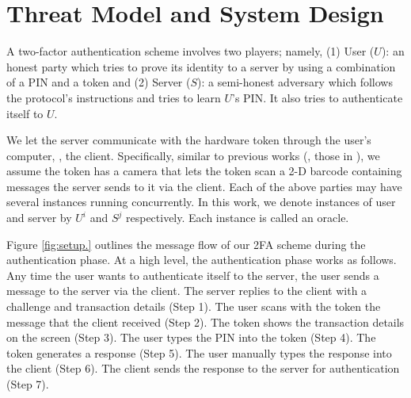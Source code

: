 


\section{Threat Model and System Design}\label{sec::model}

A two-factor authentication scheme involves two players; namely, (1) {User ($U$)}: an honest party which tries to prove its identity to a server by using a combination of a PIN and a token and (2) {Server ($S$)}:  a semi-honest adversary which follows the protocol's instructions and tries to learn $U$'s PIN. It also tries to authenticate itself to $U$.  


We let the server communicate with the hardware token through the user's computer, \ie, the client. Specifically, similar to previous works (\eg, those in \cite{JareckiJKSS21,Digipass-website,Gemalto}), we assume the token has a camera that lets the token scan a 2-D barcode containing messages the server sends to it via the client. Each of the above parties may have several instances running concurrently. In this work, we denote instances of user and server by  $U^{i}$ and  $S^{j}$ respectively. Each instance is called an oracle.  

Figure \ref{fig:setup.} outlines the message flow of our 2FA scheme during the authentication phase.  At a high level, the authentication phase works as follows. Any time the user wants to authenticate itself to the server, the user sends a message to the server via the client.  The server replies to the client with a challenge and transaction details (Step 1). The user scans with the token the message that the client received  (Step 2). The token shows the transaction details on the screen (Step 3). The user types the PIN into the token (Step 4). The token generates a response (Step 5). The user manually types the response into the client (Step 6).  The client sends the response to the server for authentication (Step 7). 





